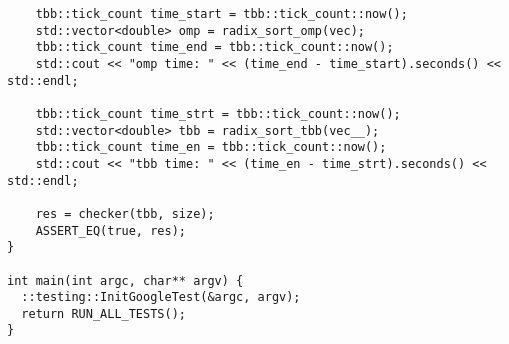 \documentclass{report}
\begin{document}
\begin{lstlisting}
	tbb::tick_count time_start = tbb::tick_count::now();
	std::vector<double> omp = radix_sort_omp(vec);
	tbb::tick_count time_end = tbb::tick_count::now();
	std::cout << "omp time: " << (time_end - time_start).seconds() << std::endl;

	tbb::tick_count time_strt = tbb::tick_count::now();
	std::vector<double> tbb = radix_sort_tbb(vec__);
	tbb::tick_count time_en = tbb::tick_count::now();
	std::cout << "tbb time: " << (time_en - time_strt).seconds() << std::endl;

	res = checker(tbb, size);
	ASSERT_EQ(true, res);
}

int main(int argc, char** argv) {
  ::testing::InitGoogleTest(&argc, argv);
  return RUN_ALL_TESTS();
}

\end{lstlisting}
\end{document}
